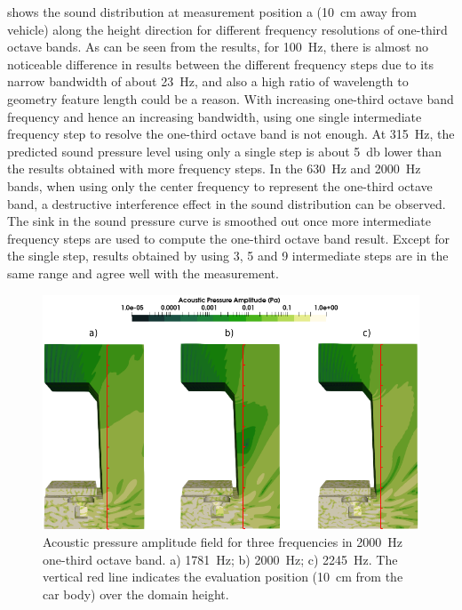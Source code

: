  shows the sound distribution at measurement position a (\SI{10}{\centi\meter} away from vehicle) along the height direction for different frequency resolutions of one-third octave bands. As can be seen from the results, for \SI{100}{\hertz}, there is almost no noticeable difference in results between the different frequency steps due to its narrow bandwidth of about \SI{23}{\hertz}, and also a high ratio of wavelength to geometry feature length could be a reason. With increasing one-third octave band frequency and hence an increasing bandwidth, using one single intermediate frequency step to resolve the one-third octave band is not enough. At \SI{315}{\hertz}, the predicted sound pressure level using only a single step is about \SI{5}{\decibel} lower than the results obtained with more frequency steps. In the \SI{630}{\hertz} and \SI{2000}{\hertz} bands, when using only the center frequency to represent the one-third octave band, a destructive interference effect in the sound distribution can be observed. The sink in the sound pressure curve is smoothed out once more intermediate frequency steps are used to compute the one-third octave band result. Except for the single step, results obtained by using 3, 5 and 9 intermediate steps are in the same range and agree well with the measurement.

\begin{figure}
	\centering
	\includegraphics[width=\textwidth]{fig/chap5/freq_steps/field_result.png}
	\caption{Acoustic pressure amplitude field for three frequencies in \SI{2000}{\hertz} one-third octave band. a) \SI{1781}{\hertz}; b) \SI{2000}{\hertz}; c) \SI{2245}{\hertz}. The vertical red line indicates the evaluation position (\SI{10}{\centi\meter} from the car body) over the domain height.}
	\label{fig:pressure_field_solution}
\end{figure}

